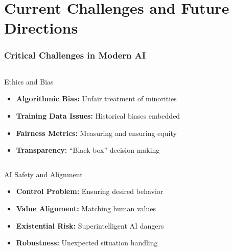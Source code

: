 \documentclass{beamer}
\begin{document}
\section{Current Challenges and Future Directions}

\begin{frame}
    \frametitle{Critical Challenges in Modern AI}
    
        \begin{column}{0.48\textwidth}
            \begin{alertblock}{Ethics and Bias}
                \begin{itemize}
                    \item \textbf{Algorithmic Bias:} Unfair treatment of minorities
                    \item \textbf{Training Data Issues:} Historical biases embedded
                    \item \textbf{Fairness Metrics:} Measuring and ensuring equity
                    \item \textbf{Transparency:} ``Black box'' decision making
                \end{itemize}
            \end{alertblock}
        \end{column}
        \begin{column}{0.48\textwidth}
            \begin{block}{AI Safety and Alignment}
                \begin{itemize}
                    \item \textbf{Control Problem:} Ensuring desired behavior
                    \item \textbf{Value Alignment:} Matching human values
                    \item \textbf{Existential Risk:} Superintelligent AI dangers
                    \item \textbf{Robustness:} Unexpected situation handling
                \end{itemize}
            \end{block}
        \end{column}

\end{frame}
\end{document}
